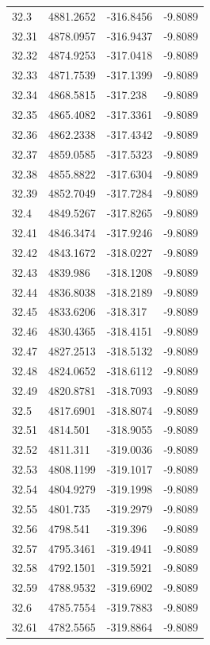 \begin{table}[H]
\begin{tabular}{llll}
32.3 & 4881.2652 & -316.8456 & -9.8089 \\
32.31 & 4878.0957 & -316.9437 & -9.8089 \\
32.32 & 4874.9253 & -317.0418 & -9.8089 \\
32.33 & 4871.7539 & -317.1399 & -9.8089 \\
32.34 & 4868.5815 & -317.238 & -9.8089 \\
32.35 & 4865.4082 & -317.3361 & -9.8089 \\
32.36 & 4862.2338 & -317.4342 & -9.8089 \\
32.37 & 4859.0585 & -317.5323 & -9.8089 \\
32.38 & 4855.8822 & -317.6304 & -9.8089 \\
32.39 & 4852.7049 & -317.7284 & -9.8089 \\
32.4 & 4849.5267 & -317.8265 & -9.8089 \\
32.41 & 4846.3474 & -317.9246 & -9.8089 \\
32.42 & 4843.1672 & -318.0227 & -9.8089 \\
32.43 & 4839.986 & -318.1208 & -9.8089 \\
32.44 & 4836.8038 & -318.2189 & -9.8089 \\
32.45 & 4833.6206 & -318.317 & -9.8089 \\
32.46 & 4830.4365 & -318.4151 & -9.8089 \\
32.47 & 4827.2513 & -318.5132 & -9.8089 \\
32.48 & 4824.0652 & -318.6112 & -9.8089 \\
32.49 & 4820.8781 & -318.7093 & -9.8089 \\
32.5 & 4817.6901 & -318.8074 & -9.8089 \\
32.51 & 4814.501 & -318.9055 & -9.8089 \\
32.52 & 4811.311 & -319.0036 & -9.8089 \\
32.53 & 4808.1199 & -319.1017 & -9.8089 \\
32.54 & 4804.9279 & -319.1998 & -9.8089 \\
32.55 & 4801.735 & -319.2979 & -9.8089 \\
32.56 & 4798.541 & -319.396 & -9.8089 \\
32.57 & 4795.3461 & -319.4941 & -9.8089 \\
32.58 & 4792.1501 & -319.5921 & -9.8089 \\
32.59 & 4788.9532 & -319.6902 & -9.8089 \\
32.6 & 4785.7554 & -319.7883 & -9.8089 \\
32.61 & 4782.5565 & -319.8864 & -9.8089 \\

\end{tabular}
\end{table}
